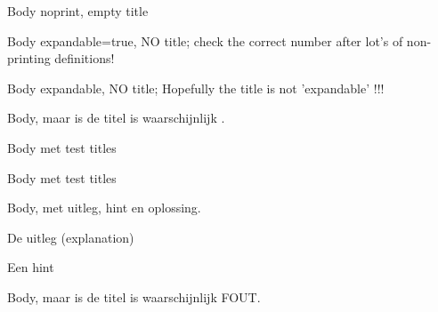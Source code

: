 \documentclass{ximera}
\begin{document}
\begin{definition}[print=false,title={}]
Body noprint,  empty title
\end{definition}

\begin{definition}[expandable=true]%
Body expandable=true, NO title; check the correct number after lot's of non-printing definitions!
\end{definition}

\begin{definition}[expandable]%
Body expandable, NO title; Hopefully the title is not 'expandable' !!!
\end{definition}

\begin{definition}
Body, maar is de titel is waarschijnlijk \color{red}{FOUT}. 
\end{definition}

\begin{definition}[Titel1, title={titel met toekenning aan 'titl'}, noexpandable, onbekendeoptiewordttitel]
Body met test titles
\end{definition}

\begin{definition}[Titel1, title={titel met toekenning aan 'title'}, noexpandable]
Body met test titles
\end{definition}


\begin{definition}
Body, met uitleg, hint en oplossing.
\begin{explanation} De uitleg (explanation) \end{explanation}
\begin{hint}        Een hint \end{hint}
\end{definition}

\begin{definition}[{{Titel, met komma's, en, haakjes maar zonder title=}}]
Body, maar is de titel is waarschijnlijk FOUT. 
\end{definition}


\end{document}
